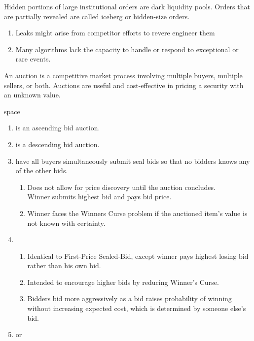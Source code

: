 Hidden portions of large institutional orders are dark liquidity pools. Orders that are partially revealed are called iceberg or hidden-size orders.

\begin{remark}
\begin{enumerate}[label=\roman*.]
\setlength{\itemsep}{0pt}
\item Leaks might arise from competitor efforts to revere engineer them
\item Many algorithms lack the capacity to handle or respond to exceptional or rare events.
\end{enumerate}
\end{remark}

An auction is a competitive market process involving multiple buyers, multiple sellers, or both. Auctions are useful and cost-effective in pricing a security with an unknown value.

\begin{definition} {\color{white}space}
\begin{enumerate}[label=\roman*.]
\setlength{\itemsep}{0pt}
\item {} is an ascending bid auction.
\item {} is a descending bid auction.
\item {} have all buyers simultaneously submit seal bids so that no bidders knows any of the other bids.
\begin{enumerate}[label=\arabic*.]
\setlength{\itemsep}{0pt}
\item Does not allow for price discovery until the auction concludes. \\
Winner submits highest bid and pays bid price.
\item Winner faces the Winners Curse problem if the auctioned item's value is not known with certainty.
\end{enumerate}
\item {}
\begin{enumerate}[label=\arabic*.]
\setlength{\itemsep}{0pt}
\item Identical to First-Price Sealed-Bid, except winner pays highest losing bid rather than his own bid.
\item Intended to encourage higher bids by reducing Winner's Curse.
\item Bidders bid more aggressively as a bid raises probability of winning without increasing expected cost, which is determined by someone else's bid.
\end{enumerate}
\item {} or 
\end{enumerate}
\end{definition}

